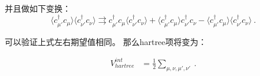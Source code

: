 并且做如下变换：
$$\langle c_{\mu'}^\dagger c_\mu^~\rangle\langle c_{\nu'}^\dagger c_\nu^~\rangle\rightrightarrows c_{\mu'}^\dagger c_\mu^~\langle c_{\nu'}^\dagger c_\nu^~\rangle+\langle c_{\mu'}^\dagger c_\mu^~\rangle c_{\nu'}^\dagger c_\nu^~-\langle c_{\mu'}^\dagger c_\mu^~\rangle\langle c_{\nu'}^\dagger c_\nu^~\rangle ~.$$

可以验证上式左右期望值相同。
那么hartree项将变为：

\begin{equation}
\begin{aligned}
V^{int}_{hartree}&=\frac{1}{2}\sum\limits_{\mu,\nu,\mu',\nu'}~.
\end{aligned}
\end{equation}
